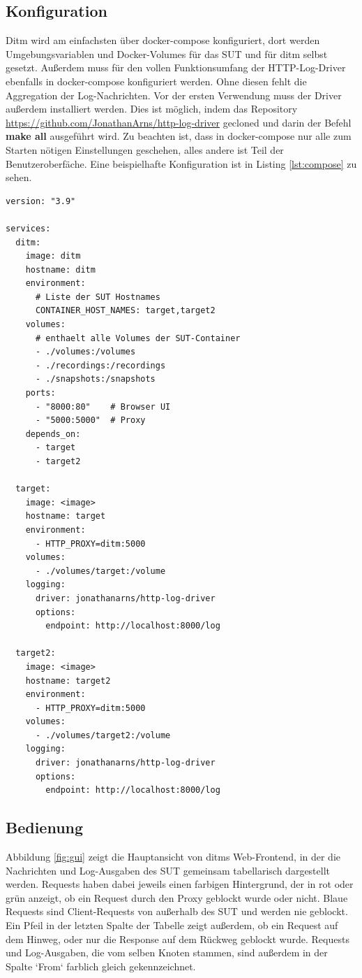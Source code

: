 \documentclass[12pt,a4paper]{report}
\begin{document}
\subsection{Konfiguration}
Ditm wird am einfachsten über docker-compose konfiguriert, dort werden Umgebungsvariablen und Docker-Volumes für das SUT und für
ditm selbst gesetzt. Außerdem muss für den vollen Funktionsumfang der HTTP-Log-Driver ebenfalls in docker-compose konfiguriert
werden. Ohne diesen fehlt die Aggregation der Log-Nachrichten. Vor der ersten Verwendung muss der Driver außerdem installiert
werden. Dies ist möglich, indem das Repository \url{https://github.com/JonathanArns/http-log-driver} gecloned und darin der Befehl
\textbf{make all} ausgeführt wird. Zu beachten ist, dass in docker-compose nur alle zum Starten nötigen Einstellungen geschehen,
alles andere ist Teil der Benutzeroberfäche. Eine beispielhafte Konfiguration ist in Listing \ref{lst:compose} zu sehen.

\newpage
\begin{lstlisting}[caption={Beispiel für ditms Konfiguration mit docker-compose}, label={lst:compose}]
version: "3.9"

services:
  ditm:
    image: ditm
    hostname: ditm
    environment:
      # Liste der SUT Hostnames
      CONTAINER_HOST_NAMES: target,target2  
    volumes:
      # enthaelt alle Volumes der SUT-Container
      - ./volumes:/volumes  
      - ./recordings:/recordings
      - ./snapshots:/snapshots
    ports:
      - "8000:80"    # Browser UI
      - "5000:5000"  # Proxy
    depends_on:
      - target
      - target2
  
  target:
    image: <image>
    hostname: target
    environment: 
      - HTTP_PROXY=ditm:5000
    volumes:
      - ./volumes/target:/volume
    logging:
      driver: jonathanarns/http-log-driver
      options:
        endpoint: http://localhost:8000/log

  target2:
    image: <image>
    hostname: target2
    environment: 
      - HTTP_PROXY=ditm:5000
    volumes:
      - ./volumes/target2:/volume
    logging:
      driver: jonathanarns/http-log-driver
      options:
        endpoint: http://localhost:8000/log
\end{lstlisting}

\subsection{Bedienung}
Abbildung \ref{fig:gui} zeigt die Hauptansicht von ditms Web-Frontend, in der die Nachrichten und Log-Ausgaben des SUT gemeinsam
tabellarisch dargestellt werden. Requests haben dabei jeweils einen farbigen Hintergrund, der in rot oder grün anzeigt, ob ein
Request durch den Proxy geblockt wurde oder nicht. Blaue Requests sind Client-Requests von außerhalb des SUT und werden nie
geblockt. Ein Pfeil in der letzten Spalte der Tabelle zeigt außerdem, ob ein Request auf dem Hinweg, oder nur die Response auf
dem Rückweg geblockt wurde. Requests und Log-Ausgaben, die vom selben Knoten stammen, sind außerdem in der Spalte `From` farblich
gleich gekennzeichnet.
\end{document}
